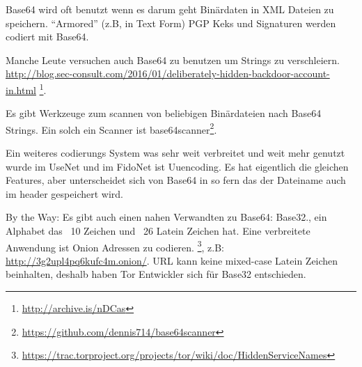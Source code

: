 Base64 wird oft benutzt wenn es darum geht Bin\"ardaten in  XML Dateien zu speichern.
``Armored'' (z.B, in Text Form) PGP Keks und Signaturen werden codiert mit Base64.

Manche Leute versuchen auch Base64 zu benutzen um Strings zu verschleiern. 
\url{http://blog.sec-consult.com/2016/01/deliberately-hidden-backdoor-account-in.html}
\footnote{\url{http://archive.is/nDCas}}.

Es gibt Werkzeuge zum scannen von beliebigen Bin\"ardateien nach Base64 Strings.
Ein solch ein Scanner ist base64scanner\footnote{\url{https://github.com/dennis714/base64scanner}}.

Ein weiteres codierungs System was sehr weit verbreitet und weit mehr genutzt wurde im UseNet und im 
FidoNet ist Uuencoding. Es hat eigentlich die gleichen Features, aber unterscheidet sich von Base64 
in so fern das der Dateiname auch im header gespeichert wird.

By the Way: Es gibt auch einen nahen Verwandten zu Base64: Base32., ein Alphabet das ~10 Zeichen und ~26 Latein Zeichen hat. 
Eine verbreitete Anwendung ist Onion Adressen zu codieren. 
\footnote{\url{https://trac.torproject.org/projects/tor/wiki/doc/HiddenServiceNames}},
z.B: \url{http://3g2upl4pq6kufc4m.onion/}.
\ac{URL} kann keine mixed-case Latein Zeichen beinhalten, deshalb haben Tor Entwickler sich f\"ur Base32 entschieden.
